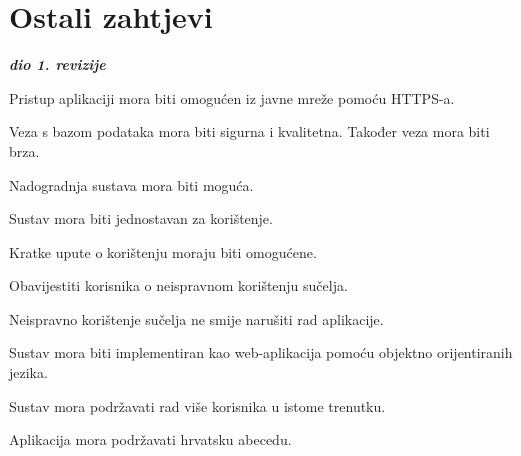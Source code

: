 		\section{Ostali zahtjevi}
		
			\textbf{\textit{dio 1. revizije}}\\
			 
			 \begin{packed_item}
			 	
			 	\item Pristup aplikaciji mora biti omogućen iz javne mreže pomoću HTTPS-a.
			 	\item Veza s bazom podataka mora biti sigurna i kvalitetna. Također veza mora biti brza.
			 	\item Nadogradnja sustava mora biti moguća.
			 	\item Sustav mora biti jednostavan za korištenje.
			 	\item Kratke upute o korištenju moraju biti omogućene.
			 	\item Obavijestiti korisnika o neispravnom korištenju sučelja.
			 	\item Neispravno korištenje sučelja ne smije narušiti rad aplikacije.
			 	\item Sustav mora biti implementiran kao web-aplikacija pomoću objektno orijentiranih jezika.
			 	\item Sustav mora podržavati rad više korisnika u istome trenutku.
			 	\item Aplikacija mora podržavati hrvatsku abecedu.
			 	
			 \end{packed_item}
			 
			 
	